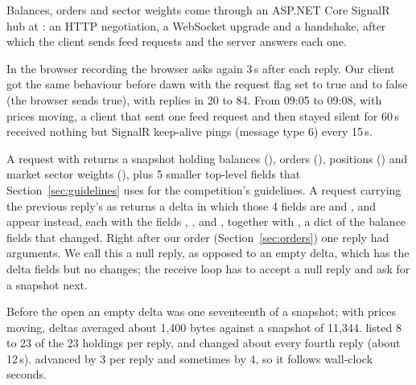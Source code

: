 \seclabel
{}

 Balances, orders and sector weights come through an ASP.NET Core SignalR hub at : an HTTP negotiation, a WebSocket upgrade and a handshake, after which the client sends feed requests and the server answers each one.



 In the browser recording the browser asks again 3\,s after each reply. Our client got the same behaviour before dawn with the request flag  set to true and to false (the browser sends true), with replies in 20 to 84\ms. From 09:05 to 09:08, with prices moving, a client that sent one feed request and then stayed silent for 60\,s received nothing but SignalR keep-alive pings (message type 6) every 15\,s.

 A request with  returns a snapshot holding balances (), orders (), positions () and market sector weights (), plus 5 smaller top-level fields that Section~\ref{sec:guidelines} uses for the competition's guidelines. A request carrying the previous reply's  as  returns a delta in which those 4 fields are  and ,  and  appear instead, each with the fields , ,  and , together with , a dict of the balance fields that changed. Right after our order (Section~\ref{sec:orders}) one reply had  arguments. We call this a null reply, as opposed to an empty delta, which has the delta fields but no changes; the receive loop has to accept a null reply and ask for a snapshot next.



 Before the open an empty delta was one seventeenth of a snapshot; with prices moving, deltas averaged about 1,400 bytes against a snapshot of 11,344.  listed 8 to 23 of the 23 holdings per reply, and  changed about every fourth reply (about 12\,s).  advanced by 3 per reply and sometimes by 4, so it follows wall-clock seconds.

